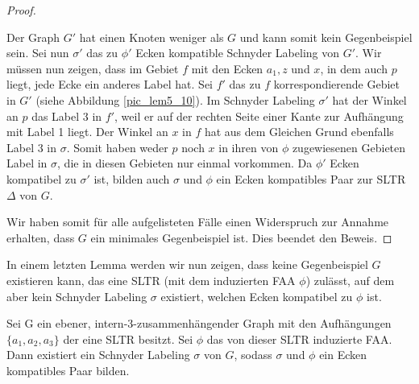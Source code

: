 \begin{proof}
\begin{description}[leftmargin =0pt, font = \rmfamily ]
Der Graph $G'$ hat einen Knoten weniger als $G$ und kann somit kein Gegenbeispiel sein. Sei nun $\sigma'$ das zu $\phi'$ Ecken kompatible Schnyder Labeling von $G'$. Wir müssen nun zeigen, dass im Gebiet $f$ mit den Ecken $a_1,z$ und $x$, in dem auch $p$ liegt, jede Ecke ein anderes Label hat. Sei $f'$ das zu $f$ korrespondierende Gebiet in $G'$ (siehe Abbildung \ref{pic_lem5_10}). Im Schnyder Labeling $\sigma'$ hat der Winkel an $p$ das Label 3 in $f'$, weil er auf der rechten Seite einer Kante zur Aufhängung mit Label 1 liegt. Der Winkel an $x$ in $f$ hat aus dem Gleichen Grund ebenfalls Label 3 in $\sigma$. Somit haben weder $p$ noch $x$ in ihren von $\phi$ zugewiesenen Gebieten Label in $\sigma$, die in diesen Gebieten nur einmal vorkommen. Da $\phi'$ Ecken kompatibel zu $\sigma'$ ist, bilden auch $\sigma$ und $\phi$ ein Ecken kompatibles Paar zur SLTR $\Delta$ von $G$.
\end{description}
Wir haben somit für alle aufgelisteten Fälle einen Widerspruch zur Annahme erhalten, dass $G$ ein minimales Gegenbeispiel ist. Dies beendet den Beweis.
\end{proof}

In einem letzten Lemma werden wir nun zeigen, dass keine Gegenbeispiel $G$ existieren kann, das eine SLTR (mit dem induzierten FAA $\phi$) zulässt, auf dem aber kein Schnyder Labeling $\sigma$ existiert, welchen Ecken kompatibel zu $\phi$ ist.

\begin{lemma}\label{lem6}
Sei G ein ebener, intern-3-zusammenhängender Graph mit den Aufhängungen $\{a_1,a_2,a_3\}$ der eine SLTR besitzt. Sei $\phi$ das von dieser SLTR induzierte FAA. Dann existiert ein Schnyder Labeling $\sigma$ von $G$, sodass $\sigma$ und $\phi$ ein Ecken kompatibles Paar bilden.
\end{lemma}

